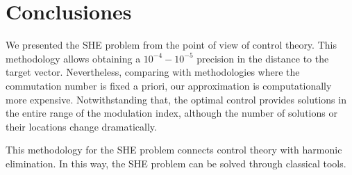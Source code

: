 \section{Conclusiones}\label{Section6}


We presented the SHE problem from the point of view of control theory. This methodology allows obtaining a $10^{-4}-10^{-5}$ precision in the distance to the target vector. Nevertheless, comparing with methodologies where the commutation number is fixed a priori, our approximation is computationally more expensive. Notwithstanding that, the optimal control provides solutions in the entire range of the modulation index, although the number of solutions or their locations change dramatically.

This methodology for the SHE problem connects control theory with harmonic elimination. In this way, the SHE problem can be solved through classical tools.
